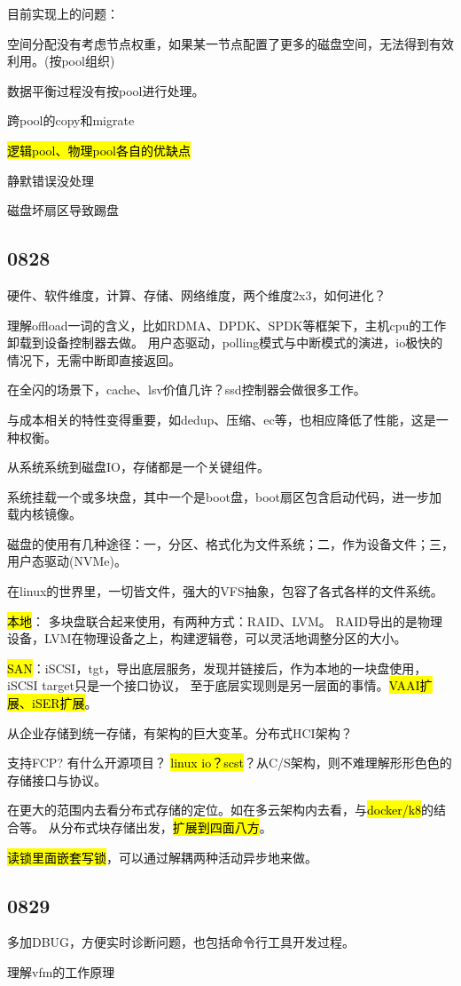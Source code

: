 目前实现上的问题：
\begin{enumbox}
\item 空间分配没有考虑节点权重，如果某一节点配置了更多的磁盘空间，无法得到有效利用。(按pool组织)
\item 数据平衡过程没有按pool进行处理。
\item 跨pool的copy和migrate
\item \hl{逻辑pool、物理pool各自的优缺点}
\item 静默错误没处理
\item 磁盘坏扇区导致踢盘
\end{enumbox}

\subsection{0828}

硬件、软件维度，计算、存储、网络维度，两个维度2x3，如何进化？

理解offload一词的含义，比如RDMA、DPDK、SPDK等框架下，主机cpu的工作卸载到设备控制器去做。
用户态驱动，polling模式与中断模式的演进，io极快的情况下，无需中断即直接返回。

在全闪的场景下，cache、lsv价值几许？ssd控制器会做很多工作。

与成本相关的特性变得重要，如dedup、压缩、ec等，也相应降低了性能，这是一种权衡。

从系统系统到磁盘IO，存储都是一个关键组件。

系统挂载一个或多块盘，其中一个是boot盘，boot扇区包含启动代码，进一步加载内核镜像。

磁盘的使用有几种途径：一，分区、格式化为文件系统；二，作为设备文件；三，用户态驱动(NVMe)。

在linux的世界里，一切皆文件，强大的VFS抽象，包容了各式各样的文件系统。

\hl{本地}： 多块盘联合起来使用，有两种方式：RAID、LVM。
RAID导出的是物理设备，LVM在物理设备之上，构建逻辑卷，可以灵活地调整分区的大小。

\hl{SAN}：iSCSI，tgt，导出底层服务，发现并链接后，作为本地的一块盘使用，iSCSI target只是一个接口协议，
至于底层实现则是另一层面的事情。\hl{VAAI扩展、iSER扩展}。

从企业存储到统一存储，有架构的巨大变革。分布式HCI架构？

支持FCP? 有什么开源项目？ \hl{linux io？scst}？从C/S架构，则不难理解形形色色的存储接口与协议。

在更大的范围内去看分布式存储的定位。如在多云架构内去看，与\hl{docker/k8}的结合等。
从分布式块存储出发，\hl{扩展到四面八方}。

\hl{读锁里面嵌套写锁}，可以通过解耦两种活动异步地来做。

\subsection{0829}

多加DBUG，方便实时诊断问题，也包括命令行工具开发过程。

理解vfm的工作原理

